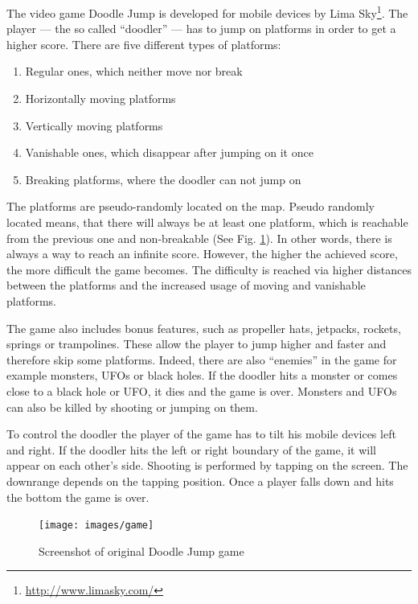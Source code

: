\documentclass[a4paper,12pt,pagesize,headsepline,bibtotoc,titlepage,abstracton]{scrartcl}
\newcommand{\quot}[1]{{``#1''}}
\begin{document}
The video game Doodle Jump is developed for mobile devices by Lima Sky\footnote{\url{http://www.limasky.com/}}. The player --- the so called \quot{doodler} --- has to jump on platforms in order to get a higher score. There are five different types of platforms:
\begin{enumerate}
    \item Regular ones, which neither move nor break
    \item Horizontally moving platforms
    \item Vertically moving platforms
    \item Vanishable ones, which disappear after jumping on it once
    \item Breaking platforms, where the doodler can not jump on
\end{enumerate}
The platforms are pseudo-randomly located on the map. Pseudo randomly located means, that there will always be at least one platform, which is reachable from the previous one and non-breakable (See Fig. \ref{abb:doodlejumpgame}). In other words, there is always a way to reach an infinite score. However, the higher the achieved score, the more difficult the game becomes. The difficulty is reached via higher distances between the platforms and the increased usage of moving and vanishable platforms.

The game also includes bonus features, such as propeller hats, jetpacks, rockets, springs or trampolines. These allow the player to jump higher and faster and therefore skip some platforms. Indeed, there are also \quot{enemies} in the game for example monsters, UFOs or black holes. If the doodler hits a monster or comes close to a black hole or UFO, it dies and the game is over. Monsters and UFOs can also be killed by shooting or jumping on them.

To control the doodler the player of the game has to tilt his mobile devices left and right. If the doodler hits the left or right boundary of the game, it will appear on each other's side. Shooting is performed by tapping on the screen. The downrange depends on the tapping position. Once a player falls down and hits the bottom the game is over.

\begin{figure}[h]
\begin{center}
\texttt{[image: images/game]}\\
\caption{Screenshot of original Doodle Jump game}
\label{abb:doodlejumpgame}
\end{center}
\end{figure}
\end{document}
